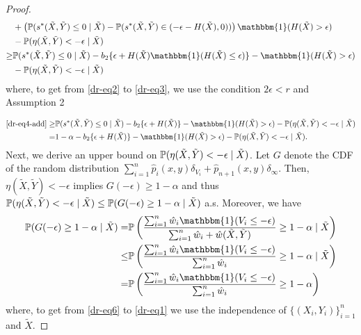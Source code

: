 \begin{proof}
\begin{align}
    &+ \left(\p(s^*(\tilde{X}, \tilde{Y}) \leq 0 \mid \tilde{X}) - \p(s^*(\tilde{X}, \tilde{Y}) \in (-\epsilon - H(\tilde{X}), 0))\right)\mathbbm{1}(H(\tilde{X}) > \epsilon) \nonumber\\
    &- \p(\eta(\tilde{X}, \tilde{Y}) < -\epsilon \mid \tilde{X})\nonumber\\
    \geq& \p(s^*(\tilde{X}, \tilde{Y})\leq 0 \mid \tilde{X} ) - b_2 \{ \epsilon + H(\tilde{X}) \mathbbm{1}(H(\tilde{X}) \leq \epsilon ) \} - \mathbbm{1}(H(\tilde{X}) > \epsilon)\nonumber\\
    &- \p(\eta(\tilde{X}, \tilde{Y}) < -\epsilon \mid \tilde{X}) \label{dr-eq4-add}
\end{align}
where, to get from \eqref{dr-eq2} to \eqref{dr-eq3}, we use the condition $2\epsilon < r$ and Assumption 2

\begin{align}
    \eqref{dr-eq4-add} \geq& \p(s^*(\tilde{X}, \tilde{Y})\leq 0 \mid \tilde{X} ) -  b_2 \{ \epsilon + H(\tilde{X})\} - \mathbbm{1}(H(\tilde{X}) > \epsilon) - \p(\eta(\tilde{X}, \tilde{Y}) < -\epsilon \mid \tilde{X}) \label{dr-eq4} \\
    =& 1 - \alpha -  b_2 \{ \epsilon + H(\tilde{X})\} - \mathbbm{1}(H(\tilde{X}) > \epsilon) - \p(\eta(\tilde{X}, \tilde{Y}) < -\epsilon \mid \tilde{X}). \label{dr-eq5}
\end{align}
Next, we derive an upper bound on $\mathbb{P}(\eta(\tilde{X}, \tilde{Y}) < -\epsilon \mid \tilde{X})$. Let $G$ denote the CDF of the random distribution $\sum_{i=1}^n \hat{p}_i(x, y)\delta_{V_i} + \hat{p}_{n+1}(x, y) \delta_{\infty}$. Then, $\eta(\tilde{X}, \tilde{Y}) < -\epsilon$ implies $G(-\epsilon) \geq 1-\alpha$ and thus $\mathbb{P}(\eta(\tilde{X}, \tilde{Y}) < -\epsilon \mid \tilde{X}) \leq \mathbb{P}(G(-\epsilon) \geq 1-\alpha \mid \tilde{X})$ a.s.
Moreover, we have
\begin{align}
    \p(G(-\epsilon) \geq 1 - \alpha \mid \tilde{X}) =& \p \left( \frac{\sum_{i=1}^n \hat{w}_i \mathbbm{1}(V_i \leq - \epsilon) }{\sum_{i=1}^n \hat{w}_i + \hat{w}(\tilde{X}, \tilde{Y}) } \geq 1 - \alpha \mid \tilde{X} \right) \nonumber \\
    \leq& \p \left( \frac{\sum_{i=1}^n \hat{w}_i \mathbbm{1}(V_i \leq - \epsilon) }{\sum_{i=1}^n \hat{w}_i} \geq 1 - \alpha \mid \tilde{X} \right) \label{dr-eq6} \\ 
    =& \p \left( \frac{\sum_{i=1}^n \hat{w}_i \mathbbm{1}(V_i \leq - \epsilon) }{\sum_{i=1}^n \hat{w}_i} \geq 1 - \alpha \right) \label{dr-eq1}
\end{align}
where, to get from \eqref{dr-eq6} to \eqref{dr-eq1} we use the independence of $\{(X_i, Y_i)\}_{i=1}^n$ and $\tilde{X}$.

\end{proof}
